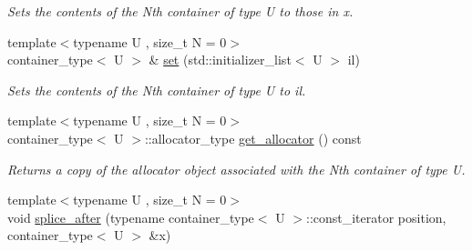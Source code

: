 \begin{DoxyCompactItemize}
\begin{DoxyCompactList}\small\item\em Sets the contents of the Nth container of type U to those in x. \end{DoxyCompactList}\item 
\hypertarget{classheterogeneous_1_1heteroforward__list_3_01_t_00_01_types_8_8_8_4_a11a608e54bb0bc30b308e6fb65f5dccc}{}{\footnotesize template$<$typename U , size\+\_\+t N = 0$>$ }\\container\+\_\+type$<$ U $>$ \& \hyperlink{classheterogeneous_1_1heteroforward__list_3_01_t_00_01_types_8_8_8_4_a11a608e54bb0bc30b308e6fb65f5dccc}{set} (std\+::initializer\+\_\+list$<$ U $>$ il)\label{classheterogeneous_1_1heteroforward__list_3_01_t_00_01_types_8_8_8_4_a11a608e54bb0bc30b308e6fb65f5dccc}

\begin{DoxyCompactList}\small\item\em Sets the contents of the Nth container of type U to il. \end{DoxyCompactList}\item 
\hypertarget{classheterogeneous_1_1heteroforward__list_3_01_t_00_01_types_8_8_8_4_a92e3b27574c00e91a640bf951b1996f6}{}{\footnotesize template$<$typename U , size\+\_\+t N = 0$>$ }\\container\+\_\+type$<$ U $>$\+::allocator\+\_\+type \hyperlink{classheterogeneous_1_1heteroforward__list_3_01_t_00_01_types_8_8_8_4_a92e3b27574c00e91a640bf951b1996f6}{get\+\_\+allocator} () const \label{classheterogeneous_1_1heteroforward__list_3_01_t_00_01_types_8_8_8_4_a92e3b27574c00e91a640bf951b1996f6}

\begin{DoxyCompactList}\small\item\em Returns a copy of the allocator object associated with the Nth container of type U. \end{DoxyCompactList}\item 
\hypertarget{classheterogeneous_1_1heteroforward__list_3_01_t_00_01_types_8_8_8_4_adbd60d6a9afc5ba4c0ab9c891a64dada}{}{\footnotesize template$<$typename U , size\+\_\+t N = 0$>$ }\\void \hyperlink{classheterogeneous_1_1heteroforward__list_3_01_t_00_01_types_8_8_8_4_adbd60d6a9afc5ba4c0ab9c891a64dada}{splice\+\_\+after} (typename container\+\_\+type$<$ U $>$\+::const\+\_\+iterator position, container\+\_\+type$<$ U $>$ \&x)\label{classheterogeneous_1_1heteroforward__list_3_01_t_00_01_types_8_8_8_4_adbd60d6a9afc5ba4c0ab9c891a64dada}


\end{DoxyCompactItemize}
